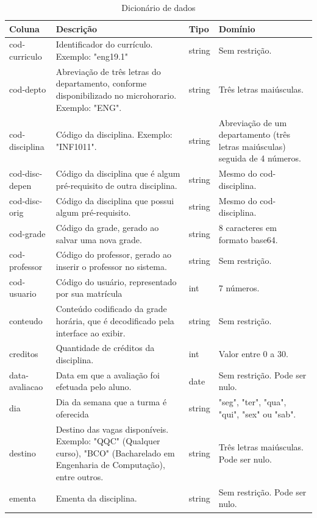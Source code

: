 \begin{longtable}{ | >{\raggedright}m{} | >{\raggedright}m{} | >{\raggedright}m{} | >{\raggedright}m{} | }
    
    \hline\textbf{Coluna} & \textbf{Descrição} & \textbf{Tipo} & \textbf{Domínio}\tabularnewline\hline\hline
    \endhead
    
    \hline\caption{Dicionário de dados}\endlastfoot

    cod-curriculo & Identificador do currículo. Exemplo: "eng19.1" & string & Sem restrição.\tabularnewline\hline
    cod-depto & Abreviação de três letras do departamento, conforme disponibilizado no microhorario. Exemplo: "ENG". & string & Três letras maiúsculas.\tabularnewline\hline
    cod-disciplina & Código da disciplina. Exemplo: "INF1011". & string & Abreviação de um departamento (três letras maiúsculas) seguida de 4 números.\tabularnewline\hline
    cod-disc-depen & Código da disciplina que é algum pré-requisito de outra disciplina. & string & Mesmo do cod-disciplina.\tabularnewline\hline
    cod-disc-orig & Código da disciplina que possui algum pré-requisito. & string & Mesmo do cod-disciplina.\tabularnewline\hline
    cod-grade & Código da grade, gerado ao salvar uma nova grade. & string & 8 caracteres em formato base64.\tabularnewline\hline
    cod-professor & Código do professor, gerado ao inserir o professor no sistema. & string & Sem restrição.\tabularnewline\hline
    cod-usuario & Código do usuário, representado por sua matrícula & int & 7 números.\tabularnewline\hline
    conteudo & Conteúdo codificado da grade horária, que é decodificado pela interface ao exibir. & string & Sem restrição.\tabularnewline\hline
    creditos & Quantidade de créditos da disciplina. & int & Valor entre 0 a 30.\tabularnewline\hline
    data-avaliacao & Data em que a avaliação foi efetuada pelo aluno. & date & Sem restrição. Pode ser nulo.\tabularnewline\hline
    dia & Dia da semana que a turma é oferecida & string & "seg", "ter", "qua", "qui", "sex" ou "sab".\tabularnewline\hline
    destino & Destino das vagas disponíveis. Exemplo: "QQC" (Qualquer curso), "BCO" (Bacharelado em Engenharia de Computação), entre outros. & string & Três letras maiúsculas. Pode ser nulo.\tabularnewline\hline
    ementa & Ementa da disciplina. & string & Sem restrição. Pode ser nulo.\tabularnewline\hline

\end{longtable}
